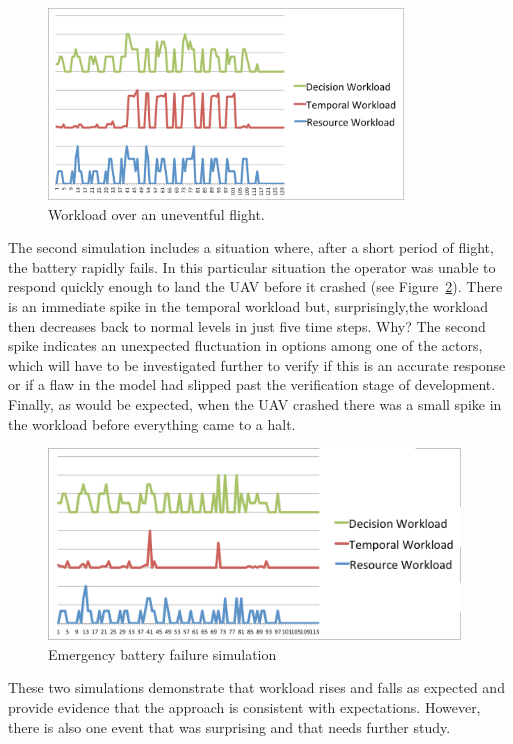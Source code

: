 \begin{figure}[h]
\center
\setlength{\abovecaptionskip}{1mm}
\setlength{\belowcaptionskip}{1mm}
\setlength{\textfloatsep}{1mm}
\setlength{\floatsep}{1mm}
\includegraphics[height=2in]{WorkloadTargetSightingLabeled.png}
\caption{Workload over an uneventful flight.}
\label{fig:WorkloadSim1}
\end{figure}

The second simulation includes a situation where, after a short period of flight, the battery rapidly fails. In this particular situation the operator was unable to respond quickly enough to land the UAV before it crashed (see Figure~\ref{fig:WorkloadSim2}). There is an immediate spike in the temporal workload but, surprisingly,the workload then decreases back to normal levels in just five time steps. {\sc Why?} The second spike indicates an unexpected fluctuation in options among one of the actors, which will have to be investigated further to verify if this is an accurate response or if a flaw in the model had slipped past the verification stage of development. Finally, as would be expected, when the UAV crashed there was a small spike in the workload before everything came to a halt. 

\begin{figure}[h]
\center
\setlength{\abovecaptionskip}{1mm}
\setlength{\belowcaptionskip}{1mm}
\setlength{\textfloatsep}{1mm}
\setlength{\floatsep}{1mm}
\includegraphics[height=2in]{WorkloadCrashedLabeled.png}
\caption{Emergency battery failure simulation}
\label{fig:WorkloadSim2}
\end{figure}

These two simulations demonstrate that workload rises and falls as expected and provide evidence that the approach is consistent with expectations.  However, there is also one event that was surprising and that needs further study.